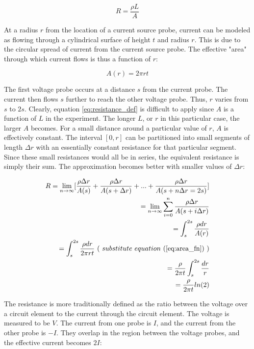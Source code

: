 \documentclass{article}
\begin{document}
\begin{equation}
\label{eq:resistance_def}
R = \frac{ \rho L }{ A }
\end{equation}

At a radius $r$ from the location of a current source probe, current can be modeled as flowing through a cylindrical surface of height $t$ and radius $r$. This is due to the circular spread of current from the current source probe. The effective "area" through which current flows is thus a function of $r$:

\begin{equation}
\label{eq:area_fn}
A(r) = 2 \pi r t
\end{equation}

The first voltage probe occurs at a distance $s$ from the current probe. The current then flows $s$ further to reach the other voltage probe. Thus, $r$ varies from $s$ to $2s$. Clearly, equation \ref{eq:resistance_def} is difficult to apply since $A$ is a function of $L$ in the experiment. The longer $L$, or $r$ in this particular case, the larger $A$ becomes.
For a small distance around a particular value of $r$, $A$ is effectively constant. The interval $[0,r]$ can be partitioned into small segments of length $\Delta r$ with an essentially constant resistance for that particular segment. Since these small resistances would all be in series, the equivalent resistance is simply their sum. The approximation becomes better with smaller values of $\Delta r$:

\begin{equation}
\label{eq:res_btwn_probes}
\begin{aligned}
R = \lim_{n\to\infty} [ \frac{ \rho \Delta r }{ A(s) } + \frac{ \rho \Delta r }{ A(s + \Delta r) } + ... + \frac{ \rho \Delta r }{ A(s + n \Delta r = 2s ) } ] \\
= \lim_{n\to\infty} \sum_{i=0}^{n} \frac{ \rho \Delta r }{ A( s + i\Delta r )} \\
= \int_{s}^{2s} \frac{ \rho dr }{ A(r) } \\
= \int_{s}^{2s} \frac{ \rho dr }{ 2 \pi r t } \ ( \ substitute \ equation \ (\ref{eq:area_fn}) \ ) \\
= \frac{ \rho }{ 2 \pi t } \int_{s}^{2s} \frac{ dr }{ r } \\
= \frac{ \rho }{ 2 \pi t } ln(2)
\end{aligned}
\end{equation}

The resistance is more traditionally defined as the ratio between the voltage over a circuit element to the current through the circuit element. The voltage is measured to be $V$. The current from one probe is $I$, and the current from the other probe is $-I$. They overlap in the region between the voltage probes, and the effective current becomes $2I$:
\end{document}
